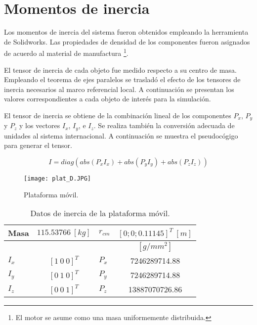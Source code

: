 \section{Momentos de inercia}
\label{sec: inertia}

Los momentos de inercia del sistema fueron obtenidos
empleando la herramienta de Solidworks. 
Las propiedades de densidad de los componentes 
fueron asignados de acuerdo al material de manufactura
\footnote{El motor se asume como una masa uniformemente distribuida.}.

El tensor de inercia de cada objeto fue medido respecto a su centro de masa.
Empleando el teorema de ejes paralelos 
\cite{olguin20183d}
se trasladó el efecto de los tensores de inercia necesarios al marco referencial local.
A continuación se presentan los valores correspondientes a cada objeto de interés para la simulación.

El tensor de inercia se obtiene de la combinación lineal 
de los componentes $P_x$, $P_y$ y $P_z$ y los vectores $ I_x$, $ I_y$, e $ I_z$.
Se realiza también la conversión adecuada de unidades al
sistema internacional.
A continuación se muestra el pseudocógigo para generar el tensor.

\begin{equation*}
 I = diag(abs(P_x  I_x) + abs(P_y I_y) +abs(P_z I_z))
\end{equation*}

\begin{figure}[htb!]
    \centering
    \texttt{[image: plat\_D.JPG]}
    \caption{Plataforma móvil.}
    \label{fig: cad platform}
\end{figure}

\begin{table}[hb!]
 \begin{center}
\begin{tabular}{lclc}
 Masa & $  115.53766 \ [kg]$ & $r_{cm}$ &  $[0; 0; 0.11145]^T \ [m]$ \\
 \hline
 & & & $[g/mm^2]$\\
 \hline
 $ I_x $ & $ [1 \ 0 \ 0]^T $ & $ P_x $ & 7246289714.88\\
 $ I_y $ & $ [0 \ 1 \ 0]^T $ & $ P_y $ & 7246289714.88\\
 $ I_z $ & $ [0 \ 0 \ 1]^T $ & $ P_z $ & 13887070726.86
\end{tabular}
\end{center}
\caption{Datos de inercia de la plataforma móvil.}
\label{tab: inertia table platform}
\end{table}


